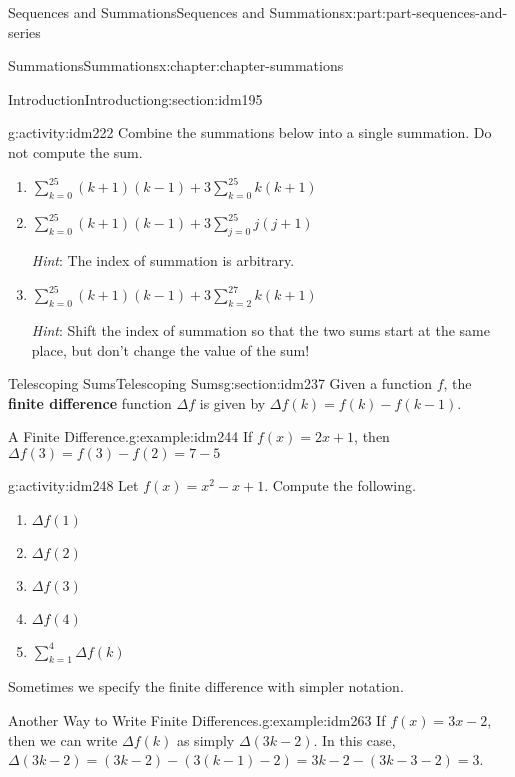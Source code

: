 \documentclass[oneside,10pt,]{book}
\newcommand{\terminology}[1]{\textbf{#1}}
\begin{document}
\begin{partptx}{Sequences and Summations}{}{Sequences and Summations}{}{}{x:part:part-sequences-and-series}
\begin{chapterptx}{Summations}{}{Summations}{}{}{x:chapter:chapter-summations}
\begin{sectionptx}{Introduction}{}{Introduction}{}{}{g:section:idm195}
\begin{activity}{}{g:activity:idm222}
Combine the summations below into a single summation. Do not compute the sum.%
\begin{enumerate}[font=\bfseries,label=(\alph*),ref=\alph*]
\item{}\(\displaystyle\sum_{k=0}^{25} (k+1)(k-1) + 3\sum_{k=0}^{25} k(k+1)\)\item{}\(\displaystyle\sum_{k=0}^{25} (k+1)(k-1) + 3\sum_{j=0}^{25} j(j+1)\)%
\par
\emph{Hint}: The index of summation is arbitrary.%
\item{}\(\displaystyle\sum_{k=0}^{25} (k+1)(k-1) + 3\sum_{k=2}^{27} k(k+1)\)%
\par
\emph{Hint}: Shift the index of summation so that the two sums start at the same place, but don't change the value of the sum!%
\end{enumerate}
\end{activity}
\end{sectionptx}
%
%
\typeout{************************************************}
\typeout{************************************************}
%
\begin{sectionptx}{Telescoping Sums}{}{Telescoping Sums}{}{}{g:section:idm237}
Given a function \(f\), the \terminology{finite difference} function \(\Delta f\) is given by \(\Delta f(k) = f(k) - f(k-1)\).%
\begin{example}{A Finite Difference.}{g:example:idm244}%
 If \(f(x) = 2x+1\), then \(\Delta f(3) = f(3) - f(2) = 7-5\)\end{example}
\begin{activity}{}{g:activity:idm248}%
Let \(f(x) = x^2-x+1\). Compute the following.%
\begin{enumerate}[font=\bfseries,label=(\alph*),ref=\alph*]
\item{}\(\Delta f(1)\)\item{}\(\Delta f(2)\)\item{}\(\Delta f(3)\)\item{}\(\Delta f(4)\)\item{}\(\displaystyle\sum_{k=1}^4\Delta f(k)\)\end{enumerate}
\end{activity}
Sometimes we specify the finite difference with simpler notation.%
\begin{example}{Another Way to Write Finite Differences.}{g:example:idm263}%
If \(f(x) = 3x-2\), then we can write \(\Delta f(k)\) as simply \(\Delta (3k-2)\). In this case, \(\Delta (3k-2) = (3k-2) - (3(k-1)-2) = 3k - 2 - (3k - 3 -2) = 3\).%

\end{example}
\end{sectionptx}
\end{chapterptx}
\end{partptx}
\end{document}
